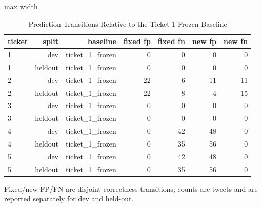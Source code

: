 \begin{table}[t]
\centering
\caption{Prediction Transitions Relative to the Ticket 1 Frozen Baseline}
\label{tab:prediction_transitions}
\begin{adjustbox}{max width=\textwidth}
\scriptsize
\begin{tabular}{lrrrrrr}
\hline
ticket & split & baseline & fixed fp & fixed fn & new fp & new fn \\
\hline
1 & dev & ticket\_1\_frozen & 0 & 0 & 0 & 0 \\
1 & heldout & ticket\_1\_frozen & 0 & 0 & 0 & 0 \\
2 & dev & ticket\_1\_frozen & 22 & 6 & 11 & 11 \\
2 & heldout & ticket\_1\_frozen & 22 & 8 & 4 & 15 \\
3 & dev & ticket\_1\_frozen & 0 & 0 & 0 & 0 \\
3 & heldout & ticket\_1\_frozen & 0 & 0 & 0 & 0 \\
4 & dev & ticket\_1\_frozen & 0 & 42 & 48 & 0 \\
4 & heldout & ticket\_1\_frozen & 0 & 35 & 56 & 0 \\
5 & dev & ticket\_1\_frozen & 0 & 42 & 48 & 0 \\
5 & heldout & ticket\_1\_frozen & 0 & 35 & 56 & 0 \\
\hline
\end{tabular}
\end{adjustbox}
\par\footnotesize{Fixed/new FP/FN are disjoint correctness transitions; counts are tweets and are reported separately for dev and held-out.}
\end{table}
